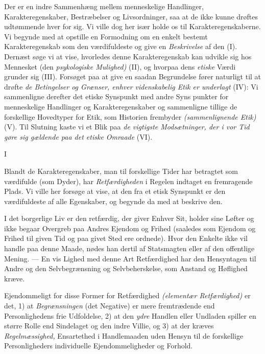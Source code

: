 \documentclass[12pt,a4paper,openany]{book}
\newcommand{\opage}[1]{\marginnote{\footnotesize\textit{[#1]}}}
\begin{document}
Der er en indre Sammenhæng mellem menneskelige Handlinger,
Karakteregenskaber, Bestræbelser og Livsordninger, saa
at de ikke kunne drøftes udtømmende hver for sig. Vi ville dog
her især holde os til Karakteregenskaberne. Vi begynde med at
opstille en Formodning om en enkelt bestemt Karakteregenskab
som den værdifuldeste og give en \textit{Beskrivelse} af den (I). Dernæst
søge vi at vise, hvorledes denne Karakteregenskab kan
udvikle sig hos Mennesket (den \textit{psykologiske Mulighed)} (II), og
hvorpaa dens \textit{etiske} Værdi grunder sig (III). Forsøget paa at
give en saadan Begrundelse fører naturligt til at drøfte \textit{de Betingelser
og Grænser, enhver videnskabelig Etik er underlagt} (IV):
Vi sammenligne derefter det etiske Synspunkt med andre Syns%
\setcounter{footnote}{0}%
\opage{55}punkter for menneskelige Handlinger og Karakteregenskaber og
sammenligne tillige de forskellige Hovedtyper for Etik, som Historien
frembyder \textit{(sammenlignende Etik)} (V). Til Slutning kaste
vi et Blik paa \textit{de vigtigste Modsætninger, der i vor Tid gøre sig
gældende paa det etiske Omraade} (VI).

\begin{center}I\end{center}


Blandt de Karakteregenskaber, man til forskellige Tider har
betragtet som værdifulde (som Dyder), har \textit{Retfærdigheden} i Regelen
indtaget en fremragende Plads. Vi ville her forsøge at
vise, at den fra et etisk Synspunkt er den værdifuldeste af alle
Egenskaber, og begynde da med at beskrive den.

I det borgerlige Liv er den retfærdig, der giver Enhver Sit,
holder sine Løfter og ikke begaar Overgreb paa Andres Ejendom
og Frihed (saaledes som Ejendom og Frihed til given Tid
og paa givet Sted ere ordnede). Hvor den Enkelte ikke vil
handle paa denne Maade, nødes han dertil af Statsmagten eller
af den offentlige Mening. --- En vis Lighed med denne Art
Retfærdighed har den Hensyntagen til Andre og den Selvbegrænsning
og Selvbeherskelse, som Anstand og Høflighed
kræve.

Ejendommeligt for disse Former for Retfærdighed \textit{(elementær
Retfærdighed)} er det, 1) at \textit{Begrænsningen} (det Negative) er mere
fremtrædende end Personlighedens frie Udfoldelse, 2) at den
\textit{ydre} Handlen eller Undladen spiller en større Rolle end Sindelaget
og den indre Villie, og 3) at der kræves \textit{Regelmæssighed,}
Ensartethed i Handlemaaden uden Hensyn til de forskellige
Personligheders individuelle Ejendommeligheder og Forhold.
\end{document}
